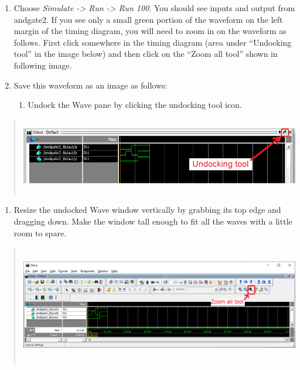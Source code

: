 \documentclass[
]{article}
\begin{document}
\begin{enumerate}
\def\labelenumi{\arabic{enumi}.}
\setcounter{enumi}{21}
\item
  Choose \emph{Simulate -\textgreater{} Run -\textgreater{} Run 100}.
  You should see inputs and output from andgate2. If you see only a
  small green portion of the waveform on the left margin of the timing
  diagram, you will need to zoom in on the waveform as follows. First
  click somewhere in the timing diagram (area under ``Undocking tool''
  in the image below) and then click on the ``Zoom all tool'' shown in
  following image.
\item
  Save this waveform as an image as follows:

  \begin{enumerate}
  \def\labelenumii{\alph{enumii}.}
  \item
    Undock the Wave pane by clicking the undocking tool icon.
  \end{enumerate}
\end{enumerate}

\begin{quote}
\includegraphics[width=6.5in,height=1.32292in]{vertopal_3cb071cd52e44dfb8dc5befe7ee47074/media/image4.png}
\end{quote}

\begin{enumerate}
\def\labelenumi{\alph{enumi}.}
\setcounter{enumi}{1}
\item
  Resize the undocked Wave window vertically by grabbing its top edge
  and dragging down. Make the window tall enough to fit all the waves
  with a little room to spare.
\end{enumerate}

\begin{quote}
\includegraphics[width=6.48889in,height=2.05486in]{vertopal_3cb071cd52e44dfb8dc5befe7ee47074/media/image5.png}
\end{quote}
\end{document}

